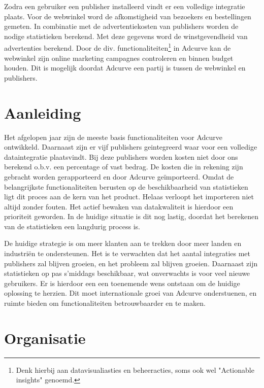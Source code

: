 Zodra een gebruiker een publisher installeerd vindt er een volledige integratie plaats. Voor de webwinkel word de afkomstigheid van bezoekers en bestellingen gemeten. In combinatie met de advertentiekosten van publishers worden de nodige statistieken berekend. Met deze gegevens word de winstgevendheid van advertenties berekend.
Door de div. functionaliteiten\footnote{Denk hierbij aan datavisualiasties en beheeracties, soms ook wel "Actionable insights" genoemd.} in Adcurve kan de webwinkel zijn online marketing campagnes controleren en binnen budget houden. Dit is mogelijk doordat Adcurve een partij is tussen de webwinkel en publishers.
\pagebreak

\section{Aanleiding} %

Het afgelopen jaar zijn de meeste basis functionaliteiten voor Adcurve ontwikkeld. Daarnaast zijn er vijf publishers geintegreerd waar voor een volledige dataintegratie plaatsvindt. Bij deze publishers worden kosten niet door ons berekend o.b.v. een percentage of vast bedrag. De kosten die in rekening zijn gebracht worden gerapporteerd en door Adcurve geïmporteerd. Omdat de belangrijkste functionaliteiten berusten op de beschikbaarheid van statistieken ligt dit proces aan de kern van het product. Helaas verloopt het importeren niet altijd zonder fouten. Het actief bewaken van datakwaliteit is hierdoor een prioriteit geworden. In de huidige situatie is dit nog lastig, doordat het berekenen van de statistieken een langdurig process is.

De huidige strategie is om meer klanten aan te trekken door meer landen en industriën te ondersteunen. Het is te verwachten dat het aantal integraties met publishers zal blijven groeien, en het probleem zal blijven groeien. Daarnaast zijn statistieken op pas s'middags beschikbaar, wat onverwachts is voor veel nieuwe gebruikers. Er is hierdoor een een toenemende wens ontstaan om de huidige oplossing te herzien. Dit moet internationale groei van Adcurve onderstuenen, en ruimte bieden om functionaliteiten betrouwbaarder en te maken.

\section{Organisatie} %

